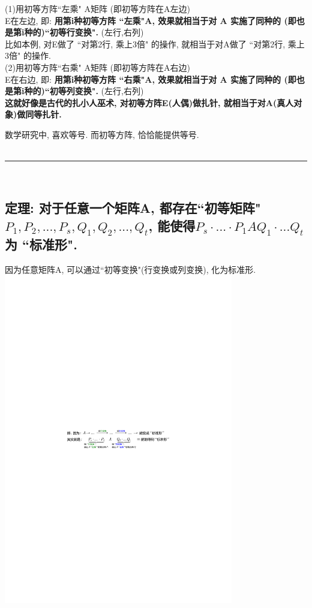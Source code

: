 \documentclass[UTF8]{ctexart}
\begin{document}
\begin{myEnvSample}
(1)用初等方阵``左乘" A矩阵 (即初等方阵在A左边)\\
E在左边, 即: \textbf{用第i种初等方阵 ``左乘"A, 效果就相当于对 A 实施了同种的  (即也是第i种的)``初等行变换".} (左行,右列) \\
比如本例, 对E做了 ``对第2行, 乘上3倍" 的操作, 就相当于对A做了 ``对第2行, 乘上3倍" 的操作.\\

(2)用初等方阵``右乘" A矩阵 (即初等方阵在A右边)\\
E在右边, 即: \textbf{用第i种初等方阵 ``右乘"A, 效果就相当于对 A 实施了同种的 (即也是第i种的)``初等列变换".} (左行,右列)\\

\textbf{这就好像是古代的扎小人巫术, 对初等方阵E(人偶)做扎针, 就相当于对A(真人对象)做同等扎针.}
\end{myEnvSample}

数学研究中, 喜欢等号. 而初等方阵, 恰恰能提供等号.\\

~\\
\hrule
~\\

\subsection{定理: 对于任意一个矩阵A, 都存在``初等矩阵" $P_1, P_2, ..., P_s, Q_1, Q_2, ..., Q_t$, 能使得$	P_s\cdot ...\cdot P_1AQ_1\cdot ...Q_t	$ 为 ``标准形".}

因为任意矩阵A, 可以通过``初等变换"(行变换或列变换), 化为标准形. \\

\includegraphics[width=0.75\textwidth]{img/0037.pdf}\\
\end{document}
